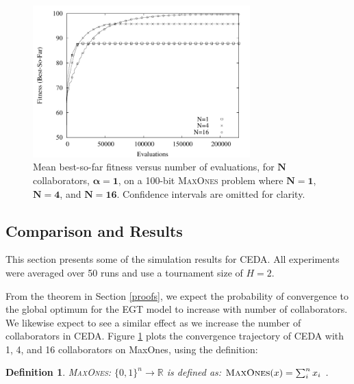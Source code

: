 \documentclass{sig-alt-full}
\newtheorem{defn}{Definition}
\begin{document}
\begin{figure}[t]
	\begin{center}
	\includegraphics[width=3.3in]{maxones_cmla_collaborators_alpha_1_evals}
	\end{center}
	\caption{Mean best-so-far fitness versus number of evaluations, for \(\bm{N}\) collaborators, \(\bm{\alpha=1}\), on a 100-bit \textsc{MaxOnes} problem where \(\bm{N=1}\), \(\bm{N=4}\), and \(\bm{N=16}\).  Confidence intervals are omitted for clarity.}
	\vspace{-1em}
	\label{fig:maxones_cmla_collaborators_alpha_1}
\end{figure}

\subsection{Comparison and Results}

This section presents some of the simulation results for CEDA.  All experiments were averaged over 50 runs and use a tournament size of \(H=2\).

From the theorem in Section \ref{proofs}, we expect the probability of convergence to the global optimum for the EGT model to increase with number of collaborators. We likewise expect to see a similar effect as we increase the number of collaborators in CEDA. Figure \ref{fig:maxones_cmla_collaborators_alpha_1} plots the convergence trajectory of CEDA with 1, 4, and 16 collaborators on {\sc MaxOnes},  using the definition:

\begin{defn}{\textsc{MaxOnes}: $\{0,1\}^n \rightarrow \mathbb{R}$ is defined as:} \(\textsc{MaxOnes}(x) = \sum_i^n x_i\) .\end{defn}
\end{document}
